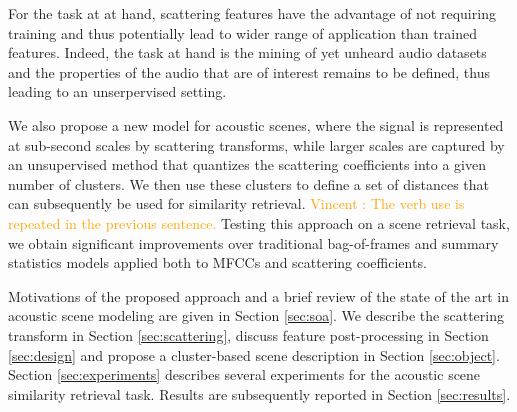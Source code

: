 \documentclass[smallextended]{svjour3}
\newcommand{\vl}[1]{\textcolor{orange}{Vincent : #1}}
\begin{document}
For the task at at hand, scattering features have the advantage of not requiring training and thus potentially lead to wider range of application than trained features. Indeed, the task at hand is the mining of yet unheard audio datasets and the properties of the audio that are of interest remains to be defined, thus leading to an unserpervised setting.



We also propose a new model for acoustic scenes, where the signal is represented at sub-second scales by scattering transforms, while larger scales are captured by an unsupervised method that quantizes the scattering coefficients into a given number of clusters. We then use these clusters to define a set of distances that can subsequently be used for similarity retrieval. \vl{The verb use is repeated in the previous sentence.} Testing this approach on a scene retrieval task, we obtain significant improvements over traditional bag-of-frames and summary statistics models applied both to MFCCs and scattering coefficients.

Motivations of the proposed approach and a brief review of the state of the art in acoustic scene modeling are given in Section \ref{sec:soa}. We describe the scattering transform in Section \ref{sec:scattering}, discuss feature post-processing in Section \ref{sec:design} and propose a cluster-based scene description in Section \ref{sec:object}. Section \ref{sec:experiments} describes several experiments for the acoustic scene similarity retrieval task. Results are subsequently reported in Section \ref{sec:results}.
\end{document}

